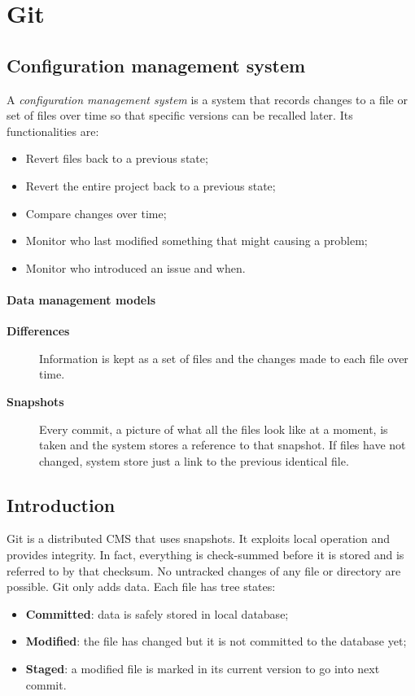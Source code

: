 \section{Git}
\subsection{Configuration management system}
A \emph{configuration management system} is a system that records changes to a file or set of files over time so that specific versions can be recalled later. Its functionalities are:
\begin{itemize}
\item Revert files back to a previous state;
\item Revert the entire project back to a previous state;
\item Compare changes over time;
\item Monitor who last modified something that might causing a problem;
\item Monitor who introduced an issue and when.
\end{itemize}

\paragraph{Data management models}
\begin{description}
\item [\textbf{Differences}] Information is kept as a set of files and the changes made to each file over time.
\item [\textbf{Snapshots}] Every commit, a picture of what all the files look like at a moment, is taken and the system stores a reference to that snapshot. If files have not changed, system store just a link to the previous identical file.
\end{description}

\subsection{Introduction}
Git is a distributed CMS that uses snapshots. It exploits local operation and provides integrity. In fact, everything is check-summed before it is stored and is referred to by that checksum. No untracked changes of any file or directory are possible. Git only adds data. Each file has tree states:
\begin{itemize}
\item \textbf{Committed}: data is safely stored in local database;
\item \textbf{Modified}: the file has changed but it is not committed to the database yet;
\item \textbf{Staged}: a modified file is marked in its current version to go into next commit.
\end{itemize}

